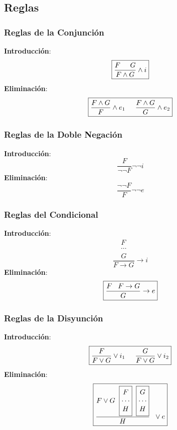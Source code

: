 \subsection{Reglas}
\subsubsection{Reglas de la Conjunción}
\noindent \textbf{Introducción}:
\[
        \boxed{\frac{F\hspace{5mm}G}{F \land G} \land i}
\]
\noindent \textbf{Eliminación}:
\[\boxed{\frac{F \land G}{F}\land e_1 \hspace{.5cm} \frac{F \land G}{G}\land e_2}
\]
\subsubsection{Reglas de la Doble Negación}
\noindent \textbf{Introducción}:
\[
        \boxed{\frac{F}{\neg \neg F} \neg \neg i}
\]
\noindent \textbf{Eliminación}:
\[\boxed{\frac{\neg \neg F}{F} \neg \neg e}
\]
\subsubsection{Reglas del Condicional}
\noindent \textbf{Introducción}:
\[\boxed{\frac{\boxed{\begin{matrix}
                                        F      \\
                                        \cdots \\
                                        G
                                \end{matrix}}}{F \rightarrow G} \rightarrow i}\]
\noindent \textbf{Eliminación}:
\[\boxed{\frac{F \hspace{3mm}F\rightarrow G}{G}\rightarrow  e}
\]
\subsubsection{Reglas de la Disyunción}
\noindent \textbf{Introducción}:
\[
        \boxed{\frac{F}{F \lor G} \lor i_1 \hspace{5mm}\frac{G}{F \lor G} \lor i_2}
\]
\noindent \textbf{Eliminación}:
\[\boxed{\frac{F \lor G \hspace{2mm}
                        \boxed{\begin{matrix}
                                        F      \\
                                        \cdots \\
                                        H
                                \end{matrix}}
                        \hspace{2mm}
                        \boxed{\begin{matrix}
                                        G      \\
                                        \cdots \\
                                        H
                                \end{matrix}}}{H} \hspace{2mm}\lor e}
\]
